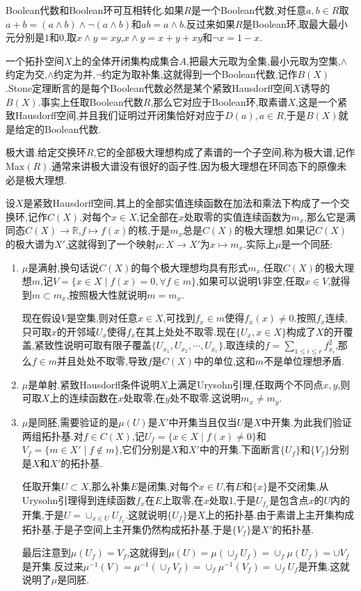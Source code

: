 Boolean代数和Boolean环可互相转化.如果$R$是一个Boolean代数,对任意$a,b\in R$取$a+b=(a\land b)\wedge\neg(a\wedge b)$和$ab=a\wedge b$.反过来如果$R$是Boolean环,取最大最小元分别是$1$和$0$,取$x\wedge y=xy$,$x\land y=x+y+xy$和$\neg x=1-x$.

一个拓扑空间$X$上的全体开闭集构成集合$A$,把最大元取为全集,最小元取为空集,$\wedge$约定为交,$\land$约定为并,$\neg$约定为取补集,这就得到一个Boolean代数,记作$B(X)$.Stone定理断言的是每个Boolean代数必然是某个紧致Hausdorff空间$X$诱导的$B(X)$.事实上任取Boolean代数$R$,那么它对应于Boolean环,取素谱$X$,这是一个紧致Hausdorff空间,并且我们证明过开闭集恰好对应于$D(a),a\in R$,于是$B(X)$就是给定的Boolean代数.

极大谱.给定交换环$R$,它的全部极大理想构成了素谱的一个子空间,称为极大谱,记作$\mathrm{Max}(R)$.通常来讲极大谱没有很好的函子性,因为极大理想在环同态下的原像未必是极大理想.

设$X$是紧致Hausdorff空间,其上的全部实值连续函数在加法和乘法下构成了一个交换环,记作$C(X)$.对每个$x\in X$,记全部在$x$处取零的实值连续函数为$m_x$,那么它是满同态$C(X)\to\mathbb{R}$,$f\mapsto f(x)$的核,于是$m_x$总是$C(X)$的极大理想.如果记$C(X)$的极大谱为$X'$,这就得到了一个映射$\mu:X\to X'$为$x\mapsto m_x$.实际上$\mu$是一个同胚:
\begin{enumerate}
	\item $\mu$是满射,换句话说$C(X)$的每个极大理想均具有形式$m_x$.任取$C(X)$的极大理想$m$,记$V=\{x\in X\mid f(x)=0,\forall f\in m\}$,如果可以说明$V$非空,任取$x\in V$,就得到$m\subset m_x$,按照极大性就说明$m=m_x$.
	
	现在假设$V$是空集,则对任意$x\in X$,可找到$f_x\in m$使得$f_x(x)\not=0$.按照$f_x$连续,只可取$x$的开邻域$U_x$使得$f_x$在其上处处不取零.现在$\{U_x,x\in X\}$构成了$X$的开覆盖,紧致性说明可取有限子覆盖$\{U_{x_1},U_{x_2},\cdots,U_{x_r}\}$.取连续的$f=\sum_{1\le i\le r}f_{x_i}^2$,那么$f\in m$并且处处不取零,导致$f$是$C(X)$中的单位,这和$m$不是单位理想矛盾.
	\item $\mu$是单射.紧致Hausdorff条件说明$X$上满足Urysohn引理,任取两个不同点$x,y$,则可取$X$上的连续函数在$x$处取零,在$y$处不取零.这说明$m_x\not=m_y$.
	\item $\mu$是同胚,需要验证的是$\mu(U)$是$X'$中开集当且仅当$U$是$X$中开集.为此我们验证两组拓扑基.对$f\in C(X)$,记$U_f=\{x\in X\mid f(x)\not=0\}$和$V_f=\{m\in X'\mid f\not\in m\}$,它们分别是$X$和$X'$中的开集.下面断言$\{U_f\}$和$\{V_f\}$分别是$X$和$X'$的拓扑基.
	
	任取开集$U\subset X$,那么补集$E$是闭集,对每个$x\in U$,有$E$和$\{x\}$是不交闭集,从Urysohn引理得到连续函数$f_x$在$E$上取零,在$x$处取1,于是$U_{f_x}$是包含点$x$的$U$内的开集,于是$U=\cup_{x\in U}U_{f_x}$.这就说明$\{U_f\}$是$X$上的拓扑基.由于素谱上主开集构成拓扑基,于是子空间上主开集仍然构成拓扑基,于是$\{V_f\}$是$X'$的拓扑基.
	
	最后注意到$\mu(U_f)=V_f$,这就得到$\mu(U)=\mu(\cup_fU_f)=\cup_f\mu(U_f)=\cup V_f$是开集.反过来$\mu^{-1}(V)=\mu^{-1}(\cup_fV_f)=\cup_f\mu^{-1}(V_f)=\cup_fU_f$是开集.这就说明了$\mu$是同胚.
\end{enumerate}


